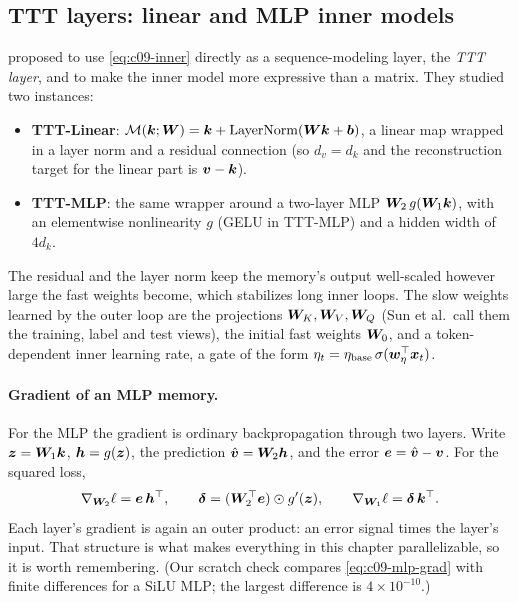 \subsection{TTT layers: linear and MLP inner models}\label{sec:c09-tttlayers}

\citet{c02-sun2024ttt} proposed to use \eqref{eq:c09-inner} directly as a sequence-modeling
layer, the \emph{TTT layer}, and to make the inner model more expressive than a matrix. They
studied two instances:
\begin{itemize}
  \item \textbf{TTT-Linear}: $\mathcal{M}(\bm{k}; \bm{W}) = \bm{k} + \operatorname{LayerNorm}(\bm{W}\bm{k} + \bm{b})$, a
        linear map wrapped in a layer norm and a residual connection (so $d_v = d_k$ and the
        reconstruction target for the linear part is $\bm{v} - \bm{k}$).
  \item \textbf{TTT-MLP}: the same wrapper around a two-layer MLP
        $\bm{W}_2\, g(\bm{W}_1\bm{k})$, with an elementwise nonlinearity $g$ (GELU in TTT-MLP) and a
        hidden width of $4 d_k$.
\end{itemize}
The residual and the layer norm keep the memory's output well-scaled however large the fast
weights become, which stabilizes long inner loops. The slow weights learned by the outer loop
are the projections $\bm{W}_K, \bm{W}_V, \bm{W}_Q$ (Sun et al.\ call them the training, label and test
views), the initial fast weights $\bm{W}_0$, and a token-dependent inner learning rate, a gate of
the form $\eta_t = \eta_{\text{base}}\,\sigma(\bm{w}_\eta^{\top}\bm{x}_t)$.

\paragraph{Gradient of an MLP memory.} For the MLP the gradient is ordinary backpropagation
through two layers. Write $\bm{z} = \bm{W}_1\bm{k}$, $\bm{h} = g(\bm{z})$, the prediction
$\hat{\bm{v}} = \bm{W}_2\bm{h}$, and the error $\bm{e} = \hat{\bm{v}} - \bm{v}$. For the squared loss,
\begin{equation}\label{eq:c09-mlp-grad}
  \nabla_{\bm{W}_2}\ell = \bm{e}\,\bm{h}^{\top}, \qquad
  \bm{\delta} = (\bm{W}_2^{\top}\bm{e}) \odot g'(\bm{z}), \qquad
  \nabla_{\bm{W}_1}\ell = \bm{\delta}\,\bm{k}^{\top} .
\end{equation}
Each layer's gradient is again an outer product: an error signal times the layer's input.
That structure is what makes everything in this chapter parallelizable, so it is worth
remembering. (Our scratch check compares \eqref{eq:c09-mlp-grad} with finite differences for a
SiLU MLP; the largest difference is $4\times10^{-10}$.)

